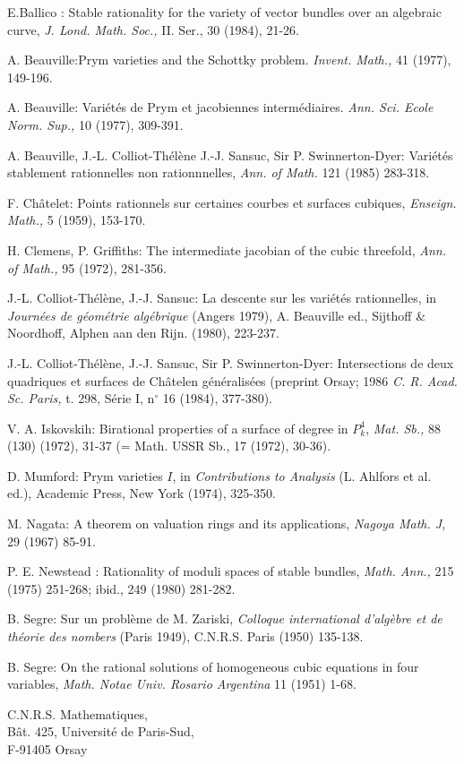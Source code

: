 \begin{thebibliography}{}
 E.\@ Ballico : Stable rationality for the variety
of vector bundles over an algebraic curve, {\em J. Lond. Math. Soc.,}
II. Ser., 30 (1984), 21-26.

 A. Beauville:\pageoriginale Prym varieties and
the Schottky problem. {\em Invent. Math.,} 41 (1977), 149-196.

 A. Beauville: Vari\'et\'es de Prym et jacobiennes
interm\'ediaires. {\em Ann. Sci. Ecole Norm. Sup.,} 10 (1977), 309-391.

 A. Beauville, J.-L. Colliot-Th\'el\`ene
J.-J. Sansuc, Sir P. Swinnerton-Dyer: Vari\'et\'es stablement
rationnelles non rationnnelles, {\em Ann. of Math.} 121 (1985) 283-318.

 F. Ch\^atelet: Points rationnels sur certaines
courbes et surfaces cubiques, {\em Enseign. Math.,} 5 (1959), 153-170.

 H. Clemens, P. Griffiths: The intermediate
jacobian of the cubic threefold, {\em Ann. of Math.,} 95 (1972), 281-356.

 J.-L. Colliot-Th\'el\`ene, J.-J. Sansuc: La
descente sur les vari\'et\'es rationnelles, in {\em Journ\'ees de
g\'eom\'etrie alg\'ebrique} (Angers 1979), A. Beauville ed.,
Sijthoff \& Noordhoff, Alphen aan den Rijn. (1980), 223-237.

 J.-L. Colliot-Th\'el\`ene, J.-J. Sansuc, Sir
P. Swinnerton-Dyer: Intersections de deux quadriques et surfaces de
Ch\^atelen g\'en\'eralis\'ees (preprint Orsay; 1986 {\em
C. R. Acad. Sc. Paris,} t. 298, S\'erie I, n$^{\circ}$ 16 (1984), 377-380).

 V. A. Iskovskih: Birational properties of a
surface of degree in $P^{4}_{k}$, {\em Mat. Sb.,} 88
(130) (1972), 31-37 (= Math. USSR Sb., 17 (1972), 30-36).

 D. Mumford: Prym varieties $I$, in {\em
Contributions to Analysis} (L. Ahlfors et al. ed.), Academic Press,
New York (1974), 325-350.

 M. Nagata: A theorem on valuation rings and its
applications, {\em Nagoya Math. J}, 29 (1967) 85-91.

 P. E. Newstead : Rationality of moduli spaces of
stable bundles, {\em Math. Ann.,} 215 (1975) 251-268; ibid., 249
(1980) 281-282.

 B. Segre: Sur un probl\`eme de M. Zariski, {\em
Colloque international d'alg\`ebre et de th\'eorie des nombers} (Paris
1949), C.N.R.S. Paris (1950) 135-138.

 B. Segre: On the rational solutions of
homogeneous cubic equations in four variables, {\em Math. Notae
Univ. Rosario Argentina} 11 (1951) 1-68.
\end{thebibliography}

\vskip 1cm
\noindent
C.N.R.S. Mathematiques,\\
B\^at. 425, Universit\'e de Paris-Sud,\\
F-91405 Orsay

